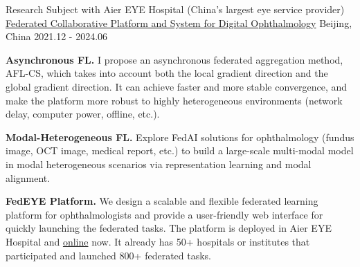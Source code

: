 \begin{cventries}
\cventry
{Research Subject with Aier EYE Hospital (China's largest eye service provider)} %
{\href{https://fedeye.aierchina.com/}{Federated Collaborative Platform and System for Digital Ophthalmology}} %
{Beijing, China} %
{2021.12 - 2024.06} %
{
    \begin{cvitems}
        \item {\textbf{Asynchronous FL.} I propose an asynchronous federated aggregation method, AFL-CS, which takes into account both the local gradient direction and the global gradient direction. It can achieve faster and more stable convergence, and make the platform more robust to highly heterogeneous environments (network delay, computer power, offline, etc.).}
        \item {\textbf{Modal-Heterogeneous FL.} Explore FedAI solutions for ophthalmology (fundus image, OCT image, medical report, etc.) to build a large-scale multi-modal model in modal heterogeneous scenarios via representation learning and modal alignment.}
        \item {\textbf{FedEYE Platform.} We design a scalable and flexible federated learning platform for ophthalmologists and provide a user-friendly web interface for quickly launching the federated tasks. The platform is deployed in Aier EYE Hospital and \textcolor{awesome-red}{\href{https://fedeye.aierchina.com/}{online}} now. It already has \textcolor{awesome-red}{50+} hospitals or institutes that participated and launched \textcolor{awesome-red}{800+} federated tasks.}
    \end{cvitems}
}



\end{cventries}
